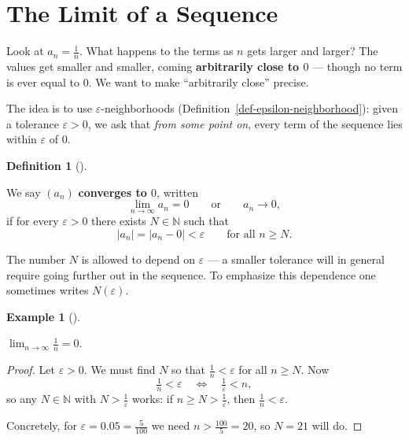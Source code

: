 \documentclass[
  letterpaper,
  DIV=11,
  numbers=noendperiod]{scrreprt}
\theoremstyle{plain}
\theoremstyle{plain}
\theoremstyle{definition}
\newtheorem{definition}{Definition}[chapter]
\theoremstyle{definition}
\theoremstyle{definition}
\newtheorem{example}{Example}[chapter]
\theoremstyle{plain}
\theoremstyle{plain}
\theoremstyle{remark}
\begin{document}
\section{The Limit of a Sequence}\label{the-limit-of-a-sequence}

Look at \(a_n = \tfrac1n\). What happens to the terms as \(n\) gets
larger and larger? The values get smaller and smaller, coming
\textbf{arbitrarily close to \(0\)} --- though no term is ever equal to
\(0\). We want to make ``arbitrarily close'' precise.

The idea is to use \(\varepsilon\)-neighborhoods
(Definition~\ref{def-epsilon-neighborhood}): given a tolerance
\(\varepsilon>0\), we ask that \emph{from some point on}, every term of
the sequence lies within \(\varepsilon\) of \(0\).

\begin{definition}[]\protect\hypertarget{def-null-sequence}{}\label{def-null-sequence}

\hfill\break
We say \((a_n)\) \textbf{converges to \(0\)}, written \[
\lim_{n\to\infty} a_n = 0 \qquad\text{or}\qquad a_n \to 0,
\] if for every \(\varepsilon>0\) there exists \(N\in\mathbb{N}\) such
that \[
\lvert a_n \rvert = \lvert a_n - 0 \rvert < \varepsilon\qquad\text{for all } n \ge N.
\]

\end{definition}

The number \(N\) is allowed to depend on \(\varepsilon\) --- a smaller
tolerance will in general require going further out in the sequence. To
emphasize this dependence one sometimes writes \(N(\varepsilon)\).

\begin{example}[]\protect\hypertarget{exm-one-over-n}{}\label{exm-one-over-n}

\hfill\break
\(\lim_{n\to\infty} \tfrac1n = 0\).

\begin{proof}
Let \(\varepsilon>0\). We must find \(N\) so that
\(\tfrac1n < \varepsilon\) for all \(n\ge N\). Now \[
\tfrac1n < \varepsilon\quad \Leftrightarrow \quad\tfrac1\varepsilon< n,
\] so any \(N \in \mathbb{N}\) with \(N > \tfrac1\varepsilon\) works: if
\(n \ge N > \tfrac1\varepsilon\), then \(\tfrac1n < \varepsilon\).

Concretely, for \(\varepsilon= 0.05 = \tfrac{5}{100}\) we need
\(n > \tfrac{100}{5} = 20\), so \(N = 21\) will do.
\end{proof}

\end{example}
\end{document}
